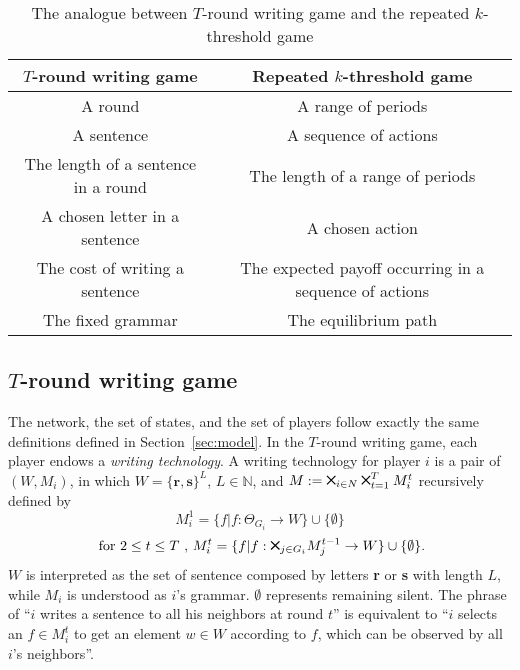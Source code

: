 \documentclass[12pt,letter]{article}
\theoremstyle{definition}
\theoremstyle{remark}
\theoremstyle{claim}
\newcommand{\bigtimes}{\mathbin{\tikz [x=1.4ex,y=1.4ex,line width=.2ex] \draw (0,0) -- (1,1) (0,1) -- (1,0);}}%
\begin{document}
\begin{table}[!htbp]
\caption{The analogue between $T$-round writing game and the repeated $k$-threshold game}
\label{table:analogue}
\begin{center}
\begin{tabular}{cc }
$T$-round writing game & Repeated $k$-threshold game \\
\hline
\hline
A round & A range of periods\\
A sentence & A sequence of actions \\
The length of a sentence in a round & The length of a range of periods\\
A chosen letter in a sentence & A chosen action\\
The cost of writing a sentence & The expected payoff occurring in a sequence of actions\\
The fixed grammar & The equilibrium path\\
\hline
\end{tabular}
\end{center}

\end{table}


\subsection{$T$-round writing game}
\label{sec:writing}
The network, the set of states, and the set of players follow exactly the same definitions defined in Section~\ref{sec:model}. In the $T$-round writing game, each player endows a \textit{writing technology}. A writing technology for player $i$ is a pair of $(W,M_i)$, in which $W=\{{\textbf{r}},\textbf{s}\}^L$, $L\in \mathbb{N}$, and $M:= \bigtimes_{i\in N}\bigtimes^T_{t=1}M^{t}_i$ recursively defined by
\[M^1_i=\{f|f:\Theta_{G_i}\rightarrow W\}\cup \{\emptyset\}\]
\[ \text{ for } 2\leq t \leq T\text{ , }M^{t}_i=\{f|f:\bigtimes_{j\in G_i}M^{t-1}_j\rightarrow W\}\cup \{\emptyset\}. \]
$W$ is interpreted as the set of sentence composed by letters \textbf{r} or \textbf{s} with length $L$, while $M_i$ is understood as $i$'s grammar. $\emptyset$ represents remaining silent. The phrase of ``$i$ writes a sentence to all his neighbors at round $t$'' is equivalent to ``$i$ selects an $f\in M^t_i$ to get an element $w\in W$ according to $f$, which can be observed by all $i$'s neighbors''. 
\end{document}
